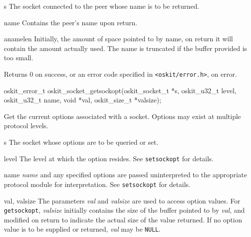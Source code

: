 \begin{apiparm}
        \item[s]
                The socket connected to the peer whose name is to be returned. 

        \item[name]
		Contains the peer's name upon return.

        \item[anamelen]
                Initially, the amount of space pointed to by name,
                on return it will contain the amount actually used.
		The name is truncated if the buffer provided is too small.

\end{apiparm}

\begin{apiret}
        Returns 0 on success, or an error code specified in
        {\tt <oskit/error.h>}, on error.
\end{apiret}

%
%

\begin{apisyn}

        \funcproto oskit_error_t
        oskit_socket_getsockopt(oskit_socket_t *s,
		 oskit_u32_t level,
		 oskit_u32_t name, 
		\outparam void *val,
		\inoutparam oskit_size_t *valsize);
\end{apisyn}

\begin{apidesc}
	Get the current options
	associated with a socket.  Options may exist at multiple protocol 
	levels. 
\end{apidesc}

\begin{apiparm}
        \item[s]
                The socket whose options are to be queried or set.

        \item[level]
		The level at which the option resides.
		See \texttt{setsockopt} for details.

        \item[name]
		\emph{name} and any specified options are passed
		uninterpreted to the appropriate protocol module
		for interpretation.
		See \texttt{setsockopt} for details.

        \item[val, valsize]
		The parameters \emph{val} and \emph{valsize}
		are used to access option values.
		For \texttt{getsockopt}, \emph{valsize} initially contains the 
		size of the buffer pointed to by \emph{val},
		and modified on return
		to indicate the actual size of the value returned.
		If no option value is to be supplied or returned,
		\emph{val} may be \texttt{NULL}.
\end{apiparm}

